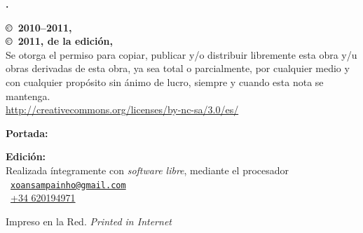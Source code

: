 \noindent
\textbf{\titlename. \subtitlename}\\
\authorname

\footnotesize

\bigskip\bigskip\noindent
\textbf{\copyright\ 2010--2011, \authorname}\\
\textbf{\copyright\ 2011, de la edición, \editorname}\\
Se otorga el permiso para copiar, publicar y/o distribuir libremente esta obra y/u obras derivadas de esta obra, ya sea total o parcialmente, por cualquier medio y con cualquier propósito sin ánimo de lucro, siempre y cuando esta nota se mantenga.\\
{\selectfont\url{http://creativecommons.org/licenses/by-nc-sa/3.0/es/}}

\normalsize

\noindent\ccbyncsaeu

\footnotesize

\bigskip\noindent
\textbf{Portada:} \coverauthorname

\bigskip\noindent
\textbf{Edición:} \editorname\\
Realizada íntegramente con \emph{software libre}, mediante el procesador \LaTeXe\\
\Letter\ {\selectfont\href{mailto:xoansampainho@gmail.com}{\nolinkurl{xoansampainho@gmail.com}}}\\
\Telefon\ \href{tel:+34620194971}{+34 620194971}

\bigskip\noindent
Impreso en la Red. \emph{Printed in Internet}

\normalsize

\endinput
